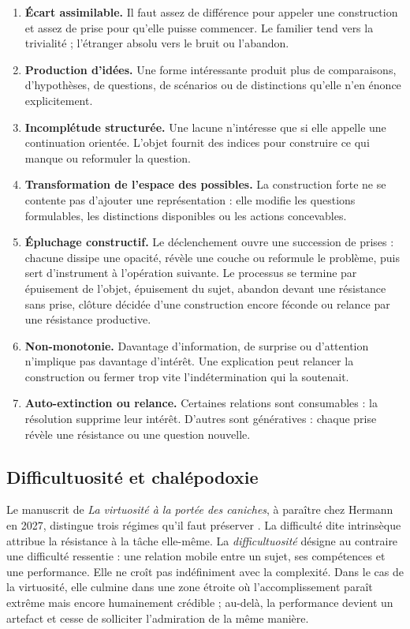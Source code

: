 \documentclass[11pt,a4paper]{article}
\begin{document}
\begin{enumerate}[resume]
  \item \textbf{Écart assimilable.} Il faut assez de différence pour appeler
        une construction et assez de prise pour qu'elle puisse commencer. Le
        familier tend vers la trivialité ; l'étranger absolu vers le bruit ou
        l'abandon.
  \item \textbf{Production d'idées.} Une forme intéressante
        produit plus de comparaisons, d'hypothèses, de questions, de scénarios
        ou de distinctions qu'elle n'en énonce explicitement.
  \item \textbf{Incomplétude structurée.} Une lacune n'intéresse que si elle
        appelle une continuation orientée. L'objet fournit des indices pour
        construire ce qui manque ou reformuler la question.
  \item \textbf{Transformation de l'espace des possibles.} La construction
        forte ne se contente pas d'ajouter une représentation : elle modifie
        les questions formulables, les distinctions disponibles ou les actions
        concevables.
  \item \textbf{Épluchage constructif.} Le déclenchement ouvre une succession
        de prises : chacune dissipe une opacité, révèle une couche ou reformule
        le problème, puis sert d'instrument à l'opération suivante. Le processus
        se termine par épuisement de l'objet, épuisement du sujet, abandon devant
        une résistance sans prise, clôture décidée d'une construction encore
        féconde ou relance par une résistance productive.
  \item \textbf{Non-monotonie.} Davantage d'information, de surprise ou
        d'attention n'implique pas davantage d'intérêt. Une explication peut
        relancer la construction ou fermer trop vite l'indétermination qui la
        soutenait.
  \item \textbf{Auto-extinction ou relance.} Certaines relations sont
        consumables : la résolution supprime leur intérêt. D'autres sont
        génératives : chaque prise révèle une résistance ou une question
        nouvelle.
\end{enumerate}

\subsection{Difficultuosité et chalépodoxie}

Le manuscrit de \emph{La virtuosité à la portée des caniches}, à paraître chez
Hermann en 2027, distingue trois régimes qu'il faut préserver
\parencite[manuscrit, 13--16]{pachet2027virtuosite}. La difficulté dite
intrinsèque attribue la résistance à la tâche elle-même. La
\emph{difficultuosité} désigne au contraire une difficulté ressentie : une
relation mobile entre un sujet, ses compétences et une performance. Elle ne
croît pas indéfiniment avec la complexité. Dans le cas de la virtuosité, elle
culmine dans une zone étroite où l'accomplissement paraît extrême mais encore
humainement crédible ; au-delà, la performance devient un artefact et cesse de
solliciter l'admiration de la même manière.
\end{document}
